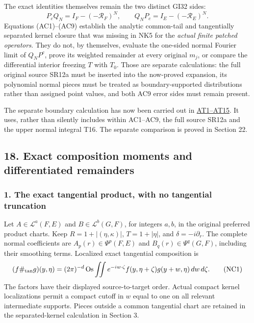 \documentclass[
  11pt,
]{article}
\makeatletter
\let\ReaderOriginalAnchorStart\hyper@anchorstart
\let\ReaderOriginalAnchorEnd\hyper@anchorend
\let\ReaderPendingAliases\@empty
\def\ReaderArmAliases#1{\gdef\ReaderPendingAliases{#1}}
\def\hyper@anchorstart#1{\ReaderIfNativeAnchorTF{#1}{\ReaderPendingAliases\global\let\ReaderPendingAliases\@empty}{}\ReaderOriginalAnchorStart{#1}}
\makeatother
\begin{document}
The exact identities themselves remain the two distinct GI32 sides: \[
 P_cQ_N=I_F-(-\mathcal R_F)^N,\qquad
 Q_NP_c=I_E-(-\mathcal R_E)^N .
 \tag{AC9}
\] Equations (AC1)--(AC9) establish the analytic common-tail and
tangentially separated kernel closure that was missing in NK5 for the
\emph{actual finite patched operators}. They do not, by themselves,
evaluate the one-sided normal Fourier limit of \(Q_NP^c\), prove its
weighted remainder at every original \(m_j\), or compare the
differential interior freezing \(T\) with \(T_0\). Those are separate
calculations: the full original source SR12a must be inserted into the
now-proved expansion, its polynomial normal pieces must be treated as
boundary-supported distributions rather than assigned point values, and
both AC9 error sides must remain present.

The separate boundary calculation has now been carried out in
\hyperref[boundary-foundation-21]{AT1--AT15}. It uses, rather than
silently includes within AC1--AC9, the full source SR12a and the upper
normal integral T16. The separate comparison is proved in Section 22.

\ReaderArmAliases{\ReaderOriginalAnchorStart{AN03-GCF-FOUNDATION-018}\ReaderOriginalAnchorEnd\begingroup\expandafter\def\csname @currentHref\endcsname{AN03-GCF-FOUNDATION-018}\label{AN03-GCF-FOUNDATION-018}\endgroup\ReaderOriginalAnchorStart{boundary-foundation-18}\ReaderOriginalAnchorEnd}
\subsection{18. Exact composition moments and differentiated
remainders}\label{boundary-foundation-18}

\subsubsection{1. The exact tangential product, with no tangential
truncation}\label{the-exact-tangential-product-with-no-tangential-truncation}

Let \(A\in\mathcal L^a(F,E)\) and \(B\in\mathcal L^b(G,F)\), for
integers \(a,b\), in the original preferred product charts. Keep
\(R=1+|(\eta,\kappa)|\), \(T=1+|\eta|\), and \(\delta=-i\partial_r\).
The complete normal coefficients are \(A_p(r)\in\Psi^p(F,E)\) and
\(B_q(r)\in\Psi^q(G,F)\), including their smoothing terms. Localized
exact tangential composition is \[
 (f\#_{\rm tan}g)(y,\eta)
 =(2\pi)^{-d}\operatorname{Os}\iint
 e^{-iw\cdot\zeta}f(y,\eta+\zeta)g(y+w,\eta)\,dw\,d\zeta.
 \tag{NC1}
\] The factors have their displayed source-to-target order. Actual
compact kernel localizations permit a compact cutoff in \(w\) equal to
one on all relevant intermediate supports. Pieces outside a common
tangential chart are retained in the separated-kernel calculation in
Section 3.
\end{document}
